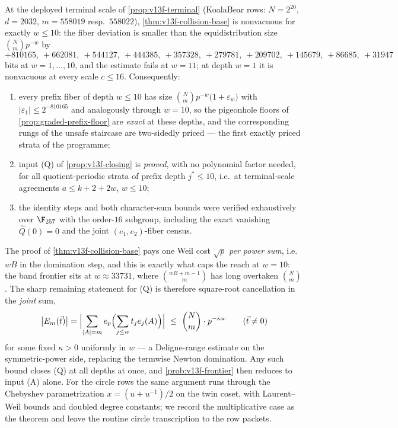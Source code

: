 \begin{corollary}\label{cor:v13f-Q-base}
At the deployed terminal scale of \cref{prop:v13f-terminal} \textup(KoalaBear rows: $N=2^{20}$, $d=2032$, $m=558019$ resp.\ $558022$\textup), \cref{thm:v13f-collision-base} is nonvacuous for exactly $w\le10$: the fiber deviation is smaller than the equidistribution size $\binom Nm p^{-w}$ by
\[
        +810165,\ +662081,\ +544127,\ +444385,\ +357328,\ +279781,\ +209702,\ +145679,\ +86685,\ +31947
\]
bits at $w=1,\ldots,10$, and the estimate fails at $w=11$; at depth $w=1$ it is nonvacuous at every scale $c\le16$.  Consequently:
\begin{enumerate}[label=\textup{(\alph*)}]
\item every prefix fiber of depth $w\le10$ has size $\binom Nm p^{-w}\bigl(1+\varepsilon_w\bigr)$ with $|\varepsilon_1|\le2^{-810165}$ and analogously through $w=10$, so the pigeonhole floors of \cref{prop:graded-prefix-floor} are \emph{exact} at these depths, and the corresponding rungs of the unsafe staircase are two-sidedly priced --- the first exactly priced strata of the programme;
\item input \textup{(Q)} of \cref{prop:v13f-closing} is \emph{proved}, with no polynomial factor needed, for all quotient-periodic strata of prefix depth $j^*\le10$, i.e.\ at terminal-scale agreements $a\le k+2+2w$, $w\le10$;
\item the identity steps and both character-sum bounds were verified exhaustively over $\F_{257}$ with the order-$16$ subgroup, including the exact vanishing $\widehat Q(0)=0$ and the joint $(e_1,e_2)$-fiber census.
\end{enumerate}
\end{corollary}

\begin{remark}\label{rem:v13f-collision-gap}
The proof of \cref{thm:v13f-collision-base} pays one Weil cost $\sqrt p$ \emph{per power sum}, i.e.\ $wB$ in the domination step, and this is exactly what caps the reach at $w=10$: the band frontier sits at $w\approx33731$, where $\binom{wB+m-1}m$ has long overtaken $\binom Nm$.  The sharp remaining statement for \textup{(Q)} is therefore square-root cancellation in the \emph{joint} sum,
\[
        \bigl|E_m(\vec t)\bigr|=\Bigl|\sum_{|A|=m}e_p\Bigl(\sum_{j\le w}t_je_j(A)\Bigr)\Bigr|
        \ \le\ \binom Nm\cdot p^{-\kappa w}\qquad(\vec t\ne0)
\]
for some fixed $\kappa>0$ uniformly in $w$ --- a Deligne-range estimate on the symmetric-power side, replacing the termwise Newton domination.  Any such bound closes \textup{(Q)} at all depths at once, and \cref{prob:v13f-frontier} then reduces to input \textup{(A)} alone.  For the circle rows the same argument runs through the Chebyshev parametrization $x=(u+u^{-1})/2$ on the twin coset, with Laurent--Weil bounds and doubled degree constants; we record the multiplicative case as the theorem and leave the routine circle transcription to the row packets.
\end{remark}

